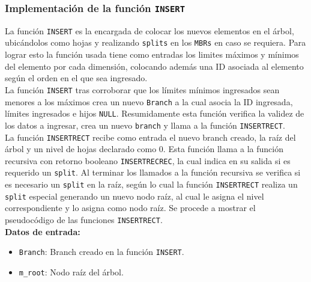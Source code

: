 \documentclass[a4paper]{article}
\newcommand\tab[1][0.5cm]{\hspace*{#1}}
\begin{document}
\subsubsection{Implementación de la función \texttt{INSERT}} %

La función \texttt{INSERT} es la encargada de colocar los nuevos elementos en el árbol, ubicándolos como hojas y realizando \texttt{splits} en los \texttt{MBRs} en caso se requiera. Para lograr esto la función usada tiene como entradas los limites máximos y mínimos del elemento por cada dimensión, colocando además una ID asociada al elemento según el orden en el que sea ingresado.\\

La función \texttt{INSERT} tras corroborar que los límites mínimos ingresados sean menores a los máximos crea un nuevo \texttt{Branch} a la cual asocia la ID ingresada, límites ingresados e hijos \texttt{NULL}. Resumidamente esta función verifica la validez de los datos a ingresar, crea un nuevo \texttt{branch} y llama a la función \texttt{INSERTRECT}.\\



La función \texttt{INSERTRECT} recibe como entrada el nuevo branch creado, la raíz del árbol y un nivel de hojas declarado como 0. Esta función llama a la función recursiva con retorno booleano \texttt{INSERTRECREC}, la cual indica en su salida si es requerido un \texttt{split}. Al terminar los llamados a la función recursiva se verifica si es necesario un \texttt{split} en la raíz, según lo cual la función \texttt{INSERTRECT} realiza un \texttt{split} especial generando un nuevo nodo raíz, al cual le asigna el nivel correspondiente y lo asigna como nodo raíz. Se procede a mostrar el pseudocódigo de las funciones \texttt{INSERTRECT}.\\
\textbf{Datos de entrada:}
\begin{itemize}
    \item \texttt{Branch}: Branch creado en la función \texttt{INSERT}.
    \item \texttt{m\_root}: Nodo raíz del árbol.
\end{itemize}
\end{document}
